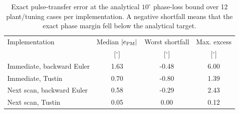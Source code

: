 \begin{table}[htbp]
\centering
\caption{Exact pulse-transfer error at the analytical $10^\circ$ phase-loss
bound over 12 plant/tuning cases per implementation. A negative shortfall
means that the exact phase margin fell below the analytical target.}
\label{tab:benchmark-aggregate}
\small
\setlength{\tabcolsep}{5pt}
\begin{tabular}{@{}lccc@{}}
\toprule
Implementation & Median $|e_{\rm PM}|$ & Worst shortfall & Max. excess\\
 & [$^\circ$] & [$^\circ$] & [$^\circ$]\\
\midrule
Immediate, backward Euler & 1.63 & -0.48 & 6.00\\
Immediate, Tustin & 0.70 & -0.80 & 1.39\\
Next scan, backward Euler & 0.58 & -0.29 & 2.43\\
Next scan, Tustin & 0.05 & 0.00 & 0.12\\
\bottomrule
\end{tabular}
\end{table}

